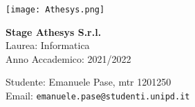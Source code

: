 \begin{minipage}[]{0.90\textwidth}
  \begin{center}
    \texttt{[image: Athesys.png]}
  \end{center}
\end{minipage}

\bigskip

\begin{minipage}[]{0.7\textwidth}
  \begin{center}
    \hspace{2cm}
    \centering
    \textcolor{Rosso}{
      \textbf{Stage Athesys S.r.l.} \\
      \hspace{2cm}Laurea: Informatica \\
      \hspace{2cm}Anno Accademico: 2021/2022
    }
  \end{center}
\end{minipage}

\bigskip

\begin{minipage}[]{0.3\textwidth}
\end{minipage}
\begin{minipage}[]{0.7\textwidth}
  \centering
  \begin{center}
    \hspace{2cm}Studente: Emanuele Pase, mtr 1201250\\
    \hspace{2cm}Email: \texttt{emanuele.pase@studenti.unipd.it}
  \end{center}
\end{minipage}

\bigskip
\bigskip
\bigskip
